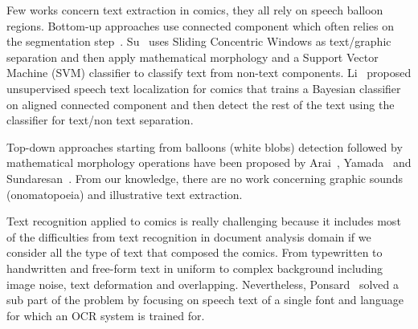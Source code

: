 Few works concern text extraction in comics, they all rely on speech balloon regions.
Bottom-up approaches use connected component which often relies on the segmentation step~\cite{ponsard2012ocr}.
Su~\cite{Su11} uses Sliding Concentric Windows as text/graphic separation and then apply mathematical morphology and a Support Vector Machine (SVM) classifier to classify text from non-text components. 
Li~\cite{Li2013Unsupervised} proposed unsupervised speech text localization for comics that trains a Bayesian classifier on aligned connected component and then detect the rest of the text using the classifier for text/non text separation.
 

Top-down approaches starting from balloons (white blobs) detection followed by mathematical morphology operations have been proposed by Arai~\cite{Arai11}, Yamada~\cite{Yam04} and Sundaresan~\cite{Sundaresan2012Text}.
From our knowledge, there are no work concerning graphic sounds (onomatopoeia) and illustrative text extraction.

Text recognition applied to comics is really challenging because it includes most of the difficulties from text recognition in document analysis domain if we consider all the type of text that composed the comics.
From typewritten to handwritten and free-form text in uniform to complex background including image noise, text deformation and overlapping.
Nevertheless, Ponsard~\cite{ponsard2012ocr} solved a sub part of the problem by focusing on speech text of a single font and language for which an OCR system is trained for.


